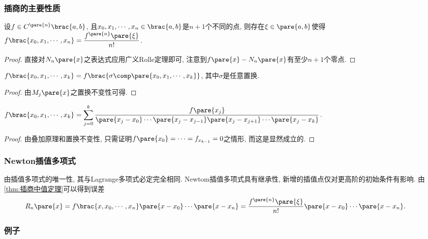 \documentclass[hidelinks]{ctexart}
\begin{document}

\subsubsection{插商的主要性质} %
\label{ssub:插商的主要性质}

\begin{theorem}
    \label{thm:插商中值定理}
    设$f\in C^{\pare{n}}\brac{a,b}$, 且$x_0,x_1,\cdots,x_n\in \brac{a,b}$是$n+1$个不同的点, 则存在$\xi \in \pare{a,b}$使得$\displaystyle f\brac{x_0,x_1,\cdots,x_n} = \frac{f^{\pare{n}}\pare{\xi}}{n!}$.
\end{theorem}
\begin{proof}
    直接对$N_n\pare{x}$之表达式应用广义Rolle定理即可, 注意到$f\pare{x} - N_n\pare{x}$有至少$n+1$个零点.
\end{proof}
\begin{theorem}
    $f\brac{x_0,x_1,\cdots,x_k} = f\brac{\sigma\comp \pare{x_0,x_1,\cdots,x_k}}$, 其中$\sigma$是任意置换.
\end{theorem}
\begin{proof}
    由$M_j\pare{x}$之置换不变性可得.
\end{proof}
\begin{theorem}
    $\displaystyle f\brac{x_0,x_1,\cdots,x_k} = \sum_{j=0}^k \frac{f\pare{x_j}}{\pare{x_j - x_0}\cdots \pare{x_j - x_{j-1}} \pare{x_j - x_{j+1}}\cdots \pare{x_j - x_k}}$.
\end{theorem}
\begin{proof}
    由叠加原理和置换不变性, 只需证明$f\pare{x_0} = \cdots = f_{x_{k-1}} = 0$之情形, 而这是显然成立的.
\end{proof}


\subsubsection{Newton插值多项式} %
\label{ssub:newton插值多项式}

\newpoint{}由插值多项式的唯一性, 其与Lagrange多项式必定完全相同.
\newpoint{}Newtom插值多项式具有继承性, 新增的插值点仅对更高阶的初始条件有影响.
\newpoint{}由\cref{thm:插商中值定理}可以得到误差
\[ R_n\pare{x} = f\brac{x,x_0,\cdots,x_n}\pare{x-x_0}\cdots\pare{x-x_n} = \frac{f^{\pare{n}}\pare{\xi}}{n!}\pare{x-x_0}\cdots\pare{x-x_n}. \]


\subsubsection{例子} %
\label{ssub:例子}
\end{document}
